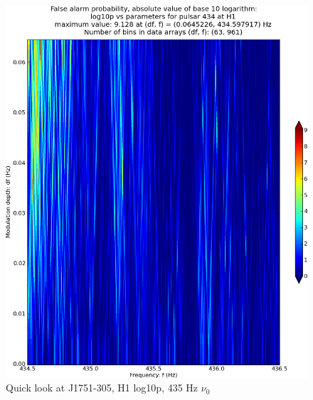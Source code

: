\begin{figure}
\begin{center}
\includegraphics[width=0.4\paperwidth,height=0.2\paperheight]{plots/DFvsFresultsProb-H1_pulsar-434.eps}
\caption{
Quick look at J1751-305, H1 log10p, 435 Hz $\nu_0$}
\end{center}
\end{figure}


